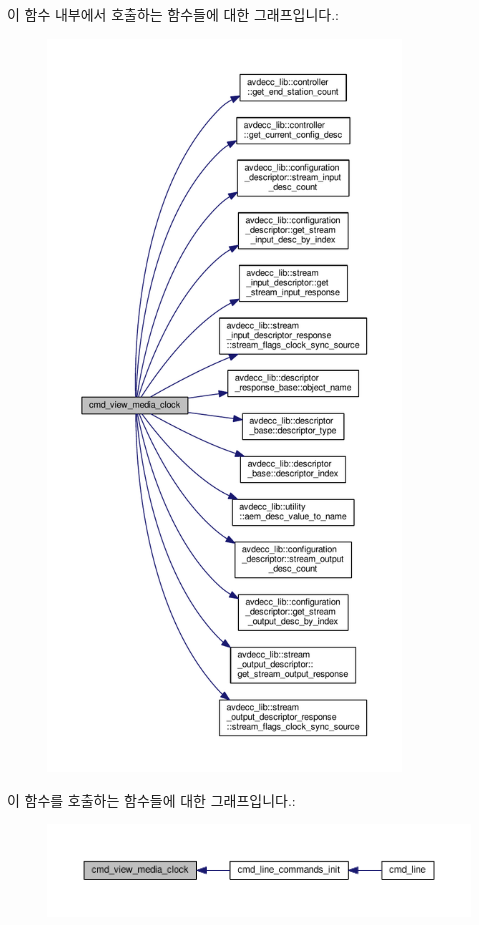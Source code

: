 이 함수 내부에서 호출하는 함수들에 대한 그래프입니다.\+:
\nopagebreak
\begin{figure}[H]
\begin{center}
\leavevmode
\includegraphics[height=550pt]{classcmd__line_a25484a960144a8421a972c552d4b829f_cgraph}
\end{center}
\end{figure}




이 함수를 호출하는 함수들에 대한 그래프입니다.\+:
\nopagebreak
\begin{figure}[H]
\begin{center}
\leavevmode
\includegraphics[width=350pt]{classcmd__line_a25484a960144a8421a972c552d4b829f_icgraph}
\end{center}
\end{figure}


